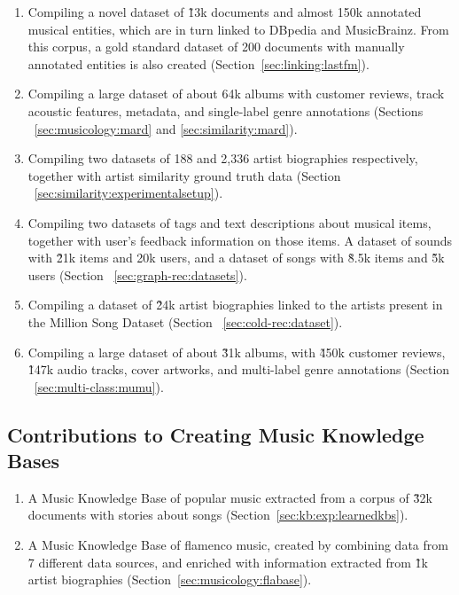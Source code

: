 \begin{enumerate}

\item 
Compiling a novel dataset of \~13k documents and almost 150k annotated musical entities, which are in turn linked to DBpedia and MusicBrainz. From this corpus, a gold standard dataset of 200 documents with manually annotated entities is also created (Section~\ref{sec:linking:lastfm}).

\item
Compiling a large dataset of about 64k albums with customer reviews, track acoustic features, metadata, and single-label genre annotations (Sections ~\ref{sec:musicology:mard} and \ref{sec:similarity:mard}).

\item
Compiling two datasets of 188 and 2,336 artist biographies respectively, together with artist similarity ground truth data (Section ~\ref{sec:similarity:experimentalsetup}).

\item
Compiling two datasets of tags and text descriptions about musical items, together with user's feedback information on those items. A dataset of sounds with \~21k items and 20k users, and a dataset of songs with \~8.5k items and \~5k users (Section ~\ref{sec:graph-rec:datasets}).

\item
Compiling a dataset of \~24k artist biographies linked to the artists present in the Million Song Dataset (Section ~\ref{sec:cold-rec:dataset}).

\item
Compiling a large dataset of about \~31k albums, with \~450k customer reviews, \~147k audio tracks, cover artworks, and multi-label genre annotations (Section ~\ref{sec:multi-class:mumu}).

\end{enumerate}

\subsection{Contributions to Creating Music Knowledge Bases}

\begin{enumerate}
\item
A Music Knowledge Base of popular music extracted from a corpus of \~32k documents with stories about songs (Section~\ref{sec:kb:exp:learnedkbs}).

\item
A Music Knowledge Base of flamenco music, created by combining data from 7 different data sources, and enriched with information extracted from \~1k artist biographies (Section~\ref{sec:musicology:flabase}).

\end{enumerate}

